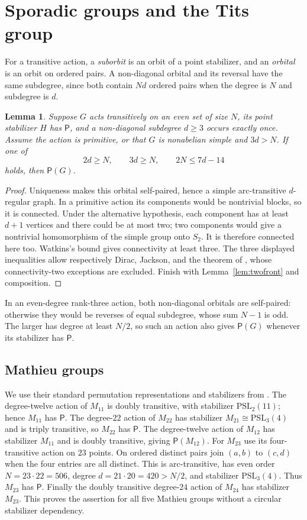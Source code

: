 \documentclass[11pt]{article}
\newtheorem{lemma}[theorem]{Lemma}
\theoremstyle{definition}
\newcommand{\Pp}{\mathsf P}
\newcommand{\PSL}{\mathrm{PSL}}
\begin{document}
\section{Sporadic groups and the Tits group}\label{sec:sporadic}
For a transitive action, a \emph{suborbit} is an orbit of a point stabilizer, and an \emph{orbital} is an orbit on ordered pairs. A non-diagonal orbital and its reversal have the same subdegree, since both contain $Nd$ ordered pairs when the degree is $N$ and subdegree is $d$.
\begin{lemma}\label{lem:uniqueorbital}
Suppose $G$ acts transitively on an even set of size $N$, its point stabilizer $H$ has $\Pp$, and a non-diagonal subdegree $d\ge3$ occurs exactly once. Assume the action is primitive, or that $G$ is nonabelian simple and $3d>N$. If one of
\[
2d\ge N,\qquad 3d\ge N,\qquad 2N\le7d-14
\]
holds, then $\Pp(G)$.
\end{lemma}
\begin{proof}
Uniqueness makes this orbital self-paired, hence a simple arc-transitive $d$-regular graph. In a primitive action its components would be nontrivial blocks, so it is connected. Under the alternative hypothesis, each component has at least $d+1$ vertices and there could be at most two; two components would give a nontrivial homomorphism of the simple group onto $S_2$. It is therefore connected here too. Watkins's bound gives connectivity at least three. The three displayed inequalities allow respectively Dirac, Jackson, and the theorem of \cite{BHVJ}, whose connectivity-two exceptions are excluded. Finish with Lemma~\ref{lem:twofront} and composition.
\end{proof}
In an even-degree rank-three action, both non-diagonal orbitals are self-paired: otherwise they would be reverses of equal subdegree, whose sum $N-1$ is odd. The larger has degree at least $N/2$, so such an action also gives $\Pp(G)$ whenever its stabilizer has $\Pp$.

\subsection{Mathieu groups}
We use their standard permutation representations and stabilizers from \cite{Atlas,AtlasRep,Cuypers}. The degree-twelve action of $M_{11}$ is doubly transitive, with stabilizer $\PSL_2(11)$; hence $M_{11}$ has $\Pp$. The degree-$22$ action of $M_{22}$ has stabilizer $M_{21}\cong\PSL_3(4)$ and is triply transitive, so $M_{22}$ has $\Pp$. The degree-twelve action of $M_{12}$ has stabilizer $M_{11}$ and is doubly transitive, giving $\Pp(M_{12})$.
For $M_{23}$ use its four-transitive action on $23$ points. On ordered distinct pairs join $(a,b)$ to $(c,d)$ when the four entries are all distinct. This is arc-transitive, has even order $N=23\cdot22=506$, degree $d=21\cdot20=420>N/2$, and stabilizer $\PSL_3(4)$. Thus $M_{23}$ has $\Pp$. Finally the doubly transitive degree-$24$ action of $M_{24}$ has stabilizer $M_{23}$. This proves the assertion for all five Mathieu groups without a circular stabilizer dependency.
\end{document}
